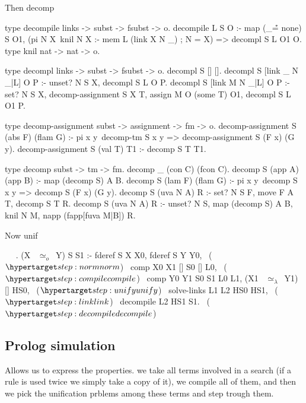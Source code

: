 \documentclass[sigconf,natbib=false]{acmart}
\newcommand{\UnifRel}{\ensuremath{\simeq}}
\newcommand{\Uo}{\ensuremath{\UnifRel_o}\xspace}
\newcommand{\Ue}{\ensuremath{\UnifRel_\lambda}\xspace}
\begin{document}
Then decomp

\begin{elpicode}
type decompile links -> subst -> fsubst -> o.
decompile L S O :-
  map (_\r\r = none) S O1, %
  (pi N X\ knil N X :- mem L (link X N _) ; N = X) =>
    decompl S L O1 O.
type knil nat -> nat -> o.

type decompl links -> subst -> fsubst -> o.
decompl S [] [].
decompl S [link _ N _|L] O P :- unset? N S X,
  decompl S L O P.
decompl S [link M N _|L] O P :- set? N S X,
  decomp-assignment S X T, assign M O (some T) O1,
  decompl S L O1 P.

type decomp-assignment subst -> assignment -> fm -> o.
decomp-assignment S (abs F) (flam G) :-
  pi x y\ decomp-tm S x y => decomp-assignment S (F x) (G y).
decomp-assignment S (val T) T1 :- decomp S T T1.

type decomp subst -> tm -> fm.
decomp _ (con C) (fcon C).
decomp S (app A) (app B) :- map (decomp S) A B.
decomp S (lam F) (flam G) :-
  pi x y\ decomp S x y => decomp S (F x) (G y).
decomp S (uva N A) R :- set? N S F,
  move F A T, decomp S T R.
decomp S (uva N A) R :- unset? N S,
  map (decomp S) A B, knil N M, napp (fapp[fuva M|B]) R.
\end{elpicode}
  

Now unif

\begin{elpicode}
~ \PYG{n+nf}{(\Uo)} ~.
(X ~\Uo~Y) S S1 :-
  fderef S X X0, fderef S Y Y0,                    ~($\customlabel{step:norm}{norm}$)~
  comp X0 X1 [] S0 [] L0,                        ~($\customlabel{step:compile}{compile}$)~
  comp Y0 Y1 S0 S1 L0 L1,
  (X1 ~\Ue~Y1) [] HS0,                              ~($\customlabel{step:unify}{unify}$)~
  solve-links L1 L2 HS0 HS1,                        ~($\customlabel{step:link}{link}$)~
  decompile L2 HS1  S1.                        ~($\customlabel{step:decompile}{decompile}$)~
\end{elpicode}

\subsection{Prolog simulation}
Allows us to express the properties.
we take all terms involved in a search (if a rule is used twice we simply
take a copy of it), we compile all of them, and then we pick the unification
prblems among these terms and step trough them.
\end{document}
